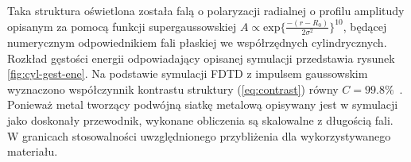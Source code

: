 Taka struktura oświetlona została falą o polaryzacji radialnej o profilu amplitudy opisanym za pomocą funkcji supergaussowskiej $A \propto \textrm{exp}\{\frac{-(r-R_0)}{2\sigma^2}\}^{10}$, będącej numerycznym odpowiednikiem fali płaskiej we współrzędnych cylindrycznych. Rozkład gęstości energii odpowiadający opisanej symulacji przedstawia rysunek \ref{fig:cyl-gest-ene}. Na podstawie symulacji FDTD z impulsem gaussowskim wyznaczono współczynnik kontrastu struktury (\ref{eq:contrast}) równy $C=99.8\%$~\cite{Yavorskiy:14}. Ponieważ metal tworzący podwójną siatkę metalową opisywany jest w symulacji jako doskonały przewodnik, wykonane obliczenia są  skalowalne z długością fali. W granicach stosowalności uwzględnionego przybliżenia dla wykorzystywanego materiału.
